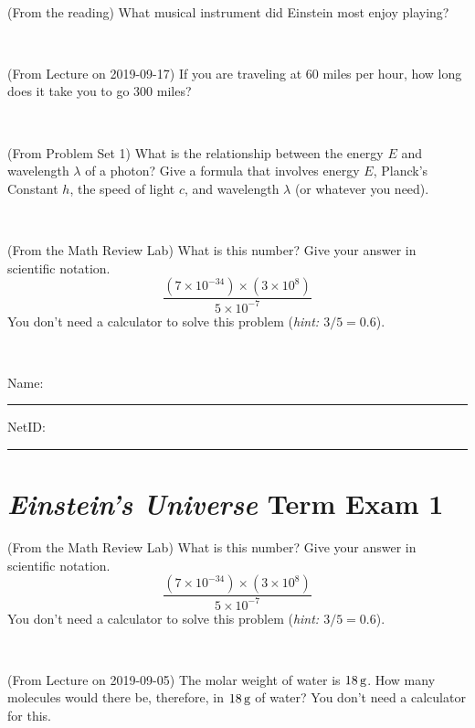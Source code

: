 \documentclass[12pt, letterpaper]{article}
\begin{document}
\vfill ~


\clearpage


\begin{problem} (From the reading)
What musical instrument did Einstein most enjoy playing?
\end{problem}


\vfill ~

\begin{problem} (From Lecture on 2019-09-17)
If you are traveling at 60 miles per hour, how long does
it take you to go 300 miles?
\end{problem}


\vfill ~

\begin{problem} (From Problem Set 1)
What is the relationship between the energy $E$ and wavelength
$\lambda$ of a photon? Give a formula that involves energy $E$,
Planck's Constant $h$, the speed of light $c$, and wavelength
$\lambda$ (or whatever you need).
\end{problem}

\vfill ~

\begin{problem} (From the Math Review Lab)
What is this number? Give your answer in scientific notation.
$$
\frac{(7\times10^{-34})\times(3\times10^8)}{5\times10^{-7}}
$$
You don't need a calculator to solve this problem (\textit{hint: $3/5=0.6$}).
\end{problem}


\vfill ~


\cleardoublepage



\noindent
Name: \rule[-1ex]{0.60\textwidth}{0.1pt}
NetID: \rule[-1ex]{0.20\textwidth}{0.1pt}

\section*{\textsl{Einstein's Universe} Term Exam 1}
\setcounter{problem}{1}


\begin{problem} (From the Math Review Lab)
What is this number? Give your answer in scientific notation.
$$
\frac{(7\times10^{-34})\times(3\times10^8)}{5\times10^{-7}}
$$
You don't need a calculator to solve this problem (\textit{hint: $3/5=0.6$}).
\end{problem}


\vfill ~

\begin{problem} (From Lecture on 2019-09-05)
The molar weight of water is $18\,\mathrm{g}$. How many molecules would there
be, therefore, in $18\,\mathrm{g}$ of water? You don't need a calculator for
this.
\end{problem}
\end{document}
